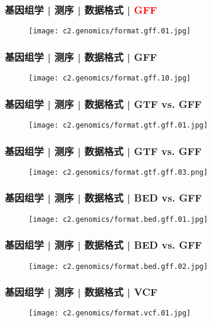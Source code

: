 \begin{frame}
  \frametitle{基因组学 | 测序 | 数据格式 | \textcolor{red}{GFF}}
  \begin{figure}
    \centering
    \texttt{[image: c2.genomics/format.gff.01.jpg]}
  \end{figure}
\end{frame}
    
\begin{frame}
  \frametitle{基因组学 | 测序 | 数据格式 | GFF}
  \begin{figure}
    \centering
    \texttt{[image: c2.genomics/format.gff.10.jpg]}
  \end{figure}
\end{frame}
    
\begin{frame}
  \frametitle{基因组学 | 测序 | 数据格式 | GTF vs. GFF}
  \begin{figure}
    \centering
    \texttt{[image: c2.genomics/format.gtf.gff.01.jpg]}
  \end{figure}
\end{frame}

\begin{frame}
  \frametitle{基因组学 | 测序 | 数据格式 | GTF vs. GFF}
  \begin{figure}
    \centering
    \texttt{[image: c2.genomics/format.gtf.gff.03.png]}
  \end{figure}
\end{frame}

\begin{frame}
  \frametitle{基因组学 | 测序 | 数据格式 | BED vs. GFF}
  \begin{figure}
    \centering
    \texttt{[image: c2.genomics/format.bed.gff.01.jpg]}
  \end{figure}
\end{frame}
    
\begin{frame}
  \frametitle{基因组学 | 测序 | 数据格式 | BED vs. GFF}
  \begin{figure}
    \centering
    \texttt{[image: c2.genomics/format.bed.gff.02.jpg]}
  \end{figure}
\end{frame}
    
\begin{frame}
  \frametitle{基因组学 | 测序 | 数据格式 | VCF}
  \begin{figure}
    \centering
    \texttt{[image: c2.genomics/format.vcf.01.jpg]}
  \end{figure}
\end{frame}
    
